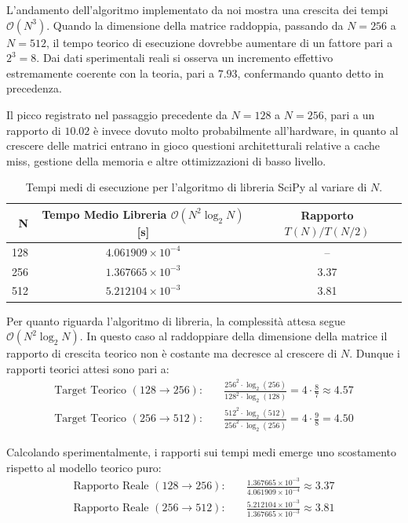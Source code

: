 \documentclass{article}
\begin{document}
L'andamento dell'algoritmo implementato da noi mostra una crescita dei tempi $\mathcal{O}(N^3)$. Quando la dimensione della matrice 
raddoppia, passando da $N=256$ a $N=512$, il tempo teorico di esecuzione dovrebbe aumentare di un fattore pari a $2^3 = 8$. 
Dai dati sperimentali reali si osserva un incremento effettivo estremamente coerente con la teoria, pari a $7.93$, confermando 
quanto detto in precedenza.

Il picco registrato nel passaggio precedente da $N=128$ a $N=256$, pari a un rapporto di $10.02$ è invece dovuto 
molto probabilmente all'hardware, in quanto al crescere delle matrici entrano in gioco questioni architetturali relative a cache miss, 
gestione della memoria e altre ottimizzazioni di basso livello. 


\begin{table}[H]
	\centering
	\begin{tabular}{rcc}
		\hline
		\textbf{N} & \textbf{Tempo Medio Libreria} $\mathcal{O}(N^2 \log_2 N)$ \textbf{[s]} & \textbf{Rapporto} $T(N)/T(N/2)$ \\ \hline
		128 & $4.061909 \times 10^{-4}$ & --    \\
		256 & $1.367665 \times 10^{-3}$ & 3.37  \\
		512 & $5.212104 \times 10^{-3}$ & 3.81  \\ \hline
	\end{tabular}
	\caption{Tempi medi di esecuzione per l'algoritmo di libreria SciPy al variare di $N$.}
	\label{tab:tempi_libreria}
\end{table}

Per quanto riguarda l'algoritmo di libreria, la complessità attesa segue \\ $\mathcal{O}(N^2 \log_2 N)$. In questo caso al raddoppiare 
della dimensione della matrice il rapporto di crescita teorico non è costante ma decresce al crescere di $N$. Dunque i rapporti teorici attesi sono pari a:
\begin{align}
	\text{Target Teorico } (128 \rightarrow 256): \quad & \frac{256^2 \cdot \log_2(256)}{128^2 \cdot \log_2(128)} = 4 \cdot \frac{8}{7} \approx 4.57 \\
	\text{Target Teorico } (256 \rightarrow 512): \quad & \frac{512^2 \cdot \log_2(512)}{256^2 \cdot \log_2(256)} = 4 \cdot \frac{9}{8} = 4.50
\end{align}

Calcolando sperimentalmente, i rapporti sui tempi medi emerge uno scostamento rispetto al modello teorico puro:
\begin{align}
	\text{Rapporto Reale } (128 \rightarrow 256): \quad & \frac{1.367665 \times 10^{-3}}{4.061909 \times 10^{-4}} \approx 3.37 \\
	\text{Rapporto Reale } (256 \rightarrow 512): \quad & \frac{5.212104 \times 10^{-3}}{1.367665 \times 10^{-3}} \approx 3.81
\end{align}
\end{document}
